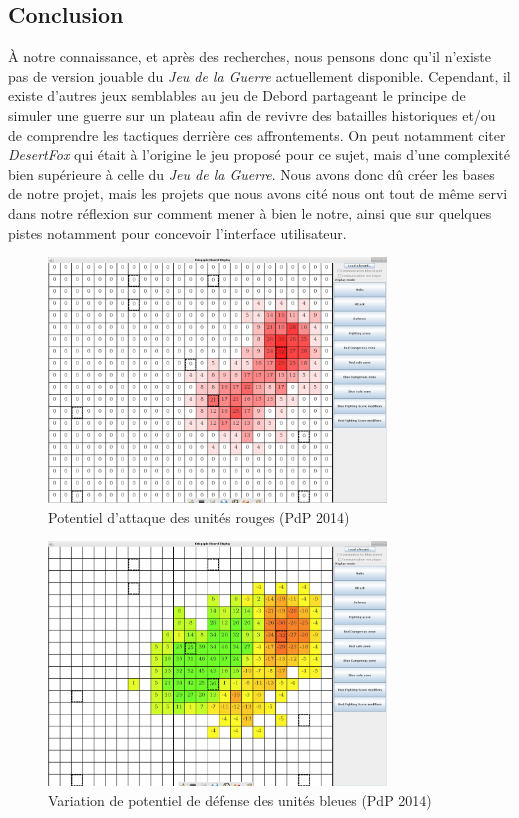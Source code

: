 \documentclass[a4paper]{report}
\begin{document}
\subsection*{Conclusion}
\`A notre connaissance, et après des recherches, nous pensons donc qu'il n'existe pas de version jouable du \textit{Jeu de la Guerre} actuellement disponible. Cependant, il existe d'autres jeux semblables au jeu de Debord partageant le principe de simuler une guerre sur un plateau afin de revivre des batailles historiques et/ou de comprendre les tactiques derrière ces affrontements. On peut notamment citer \textit{DesertFox}\cite{desertfox} qui était à l'origine le jeu proposé pour ce sujet, mais d'une complexité bien supérieure à celle du \textit{Jeu de la Guerre}. Nous avons donc dû créer les bases de notre projet, mais les projets que nous avons cité nous ont tout de même servi dans notre réflexion sur comment mener à bien le notre, ainsi que sur quelques pistes notamment pour concevoir l'interface utilisateur.



\begin{figure}[h]
\centering
\includegraphics[width=0.8\textwidth]{existantPDP/pdp20142}
\caption{Potentiel d'attaque des unités rouges (PdP 2014)}\label{fig:PdP2014Atk}
\end{figure}

\begin{figure}[h]
\centering
\includegraphics[width=0.8\textwidth]{existantPDP/pdp20143}
\caption{Variation de potentiel de défense des unités bleues (PdP 2014)}\label{fig:PdP2014Def}
\end{figure}
\end{document}
